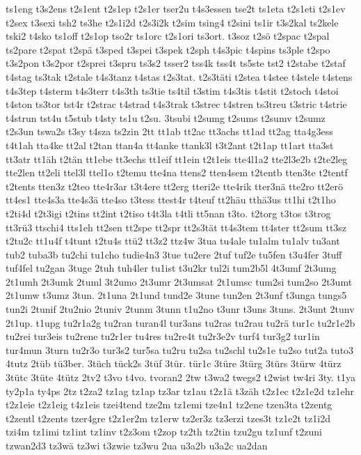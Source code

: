 {ts1eng
t3s2ens
t2s1ent
t2s1ep
t2s1er
tser2u
t4s3essen
tse2t
ts1eta
t2s1eti
t2s1ev
t2sex
t3sexi
tsh2
ts3he
t2s1i2d
t2s3i2k
t2sim
tsing4
t2sini
ts1ir
t3s2kal
ts2kele
tski2
t4sko
ts1off
t2s1op
tso2r
ts1orc
t2s1ori
ts3ort.
t3soz
t2sö
t2spac
t2spal
ts2pare
t2spat
t2spä
t3sped
t3spei
t3spek
t2sph
t4s3pic
t4spins
ts3ple
t2spo
t3s2pon
t3s2por
t2sprei
t3spru
ts3s2
tsser2
tss4k
tss4t
ts5ste
tst2
t2stabe
t2staf
t4stag
ts3tak
t2stale
t4s3tanz
t4stas
t2s3tat.
t2s3täti
t2stea
t4stee
t4stele
t4stens
t4s3tep
t4sterm
t4s3terr
t4s3th
ts3tie
ts4til
t3stim
t4s3tis
t4stit
t2stoch
t4stoi
t4ston
ts3tor
tst4r
t2strac
t4strad
t4s3trak
t3strec
t4stren
ts3treu
t3stric
t4strie
t4strun
tst4u
t5stub
t4sty
ts1u
t2su.
3tsubi
t2sumg
t2sums
t2sumv
t2sumz
t2s3un
tswa2s
t3sy
t4sza
ts2zin
2tt
tt1ab
tt2ac
tt3achs
tt1ad
tt2ag
tta4g3ess
t4t1ah
tta4ke
tt2al
t2tan
ttan4a
tt4anke
ttank3l
t3t2ant
t2t1ap
tt1art
tta3st
tt3atr
tt1äh
t2tän
tt1ebe
tt3echs
tt1eif
tt1ein
t2t1eis
tte4l1a2
tte2l3e2b
t2te2leg
tte2len
tt2eli
ttel3l
ttel1o
t2temu
tte4na
ttens2
tten4sem
t2tentb
tten3te
t2tentf
t2tents
tten3z
t2teo
tte4r3ar
t3t4ere
tt2erg
tteri2e
tte4rik
tter3nä
tte2ro
tt2erö
tt4es1
tte4s3a
tte4s3ä
tte4so
t3tess
ttest4r
t4teuf
tt2häu
tthä3us
tt1hi
t2t1ho
t2ti4d
t2t3igi
t2tins
tt2int
t2tiso
t4t3la
t4tli
tt5nan
t3to.
t2torg
t3tos
t3trog
tt3rü3
ttschi4
tts1eh
tt2sen
tt2spe
tt2spr
tt2s3tät
tt4s3tem
tt4ster
tt2sum
tt3sz
t2tu2c
tt1u4f
t4tunt
t2tu4s
ttü2
tt3z2
ttz4w
3tua
tu4ale
tu1alm
tu1alv
tu3ant
tub2
tuba3b
tu2chi
tu1cho
tudie4n3
3tue
tu2ere
2tuf
tuf2e
tu5fen
t3u4fer
3tuff
tuf4fel
tu2gan
3tuge
2tuh
tuh4ler
tu1ist
t3u2kr
tul2i
tum2b5l
4t3umf
2t3umg
2t1umh
2t3umk
2tuml
3t2umo
2t3umr
2t3umsat
2t1umsc
tum2si
tum2so
2t3umt
2t1umw
t3umz
3tun.
2t1una
2t1und
tund2e
3tune
tun2en
2t3unf
t3unga
tungs5
tun2i
2tunif
2tu2nio
2tuniv
2tunm
3tunn
t1u2no
t3unr
t3uns
3tuns.
2t3unt
2tunv
2t1up.
t1upg
tu2r1a2g
tu2ran
turan4l
tur3ans
tu2ras
tu2rau
tu2rä
tur1c
tu2r1e2b
tu2rei
tur3eis
tu2rene
tu2r1er
tu4res
tu2re4t
tu2r3e2v
turf4
tur3g2
tur1in
tur4mun
3turn
tu2r3o
tur3s2
tur5sa
tu2ru
tu2sa
tu2schl
tu2s1e
tu2so
tut2a
tuto3
4tutz
2tüb
tü3ber.
3tüch
tück2s
3tüf
3tür.
tür1c
3türe
3türg
3türs
3türw
4türz
3tütc
3tüte
4tütz
2tv2
t3vo
t4vo.
tvoran2
2tw
t3wa2
twegs2
t2wist
tw4ri
3ty.
t1ya
ty2p1a
ty4ps
2tz
t2za2
tz1ag
tz1ap
tz3ar
tz1au
t2z1ä
t3zäh
t2z1ec
t2z1e2d
tz1ehr
t2z1eie
t2z1eig
t4z1eis
tzei4tend
tze2m
tz1emi
tze4n1
tz2ene
tzen3ta
t2zentg
t2zentl
t2zents
tzer4gre
t2z1er2m
tz1erw
tz2er3z
tz3erzi
tzes3t
tz1e2t
tz1i2d
tzi4m
tz1imi
tz1int
tz1inv
t2z3om
t2zop
tz2th
tz2tin
tzu2gu
tz1unf
t2zuni
tzwan2d3
tz3wä
tz3wi
t3zwie
tz3wu
2ua
u3a2b
u3a2c
ua2dan
}
